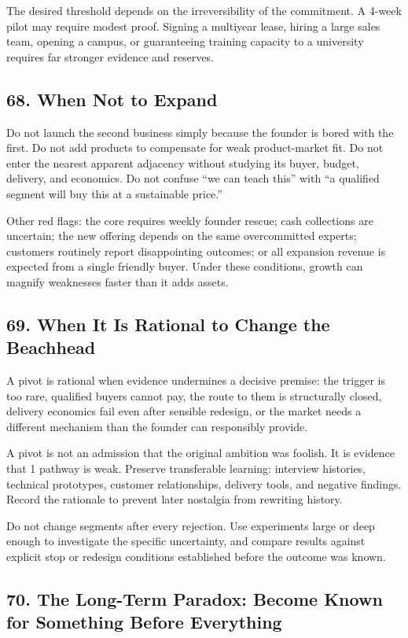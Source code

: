 The desired threshold depends on the irreversibility of the commitment. A 4-week pilot may require modest proof. Signing a multiyear lease, hiring a large sales team, opening a campus, or guaranteeing training capacity to a university requires far stronger evidence and reserves.

\subsection*{68. When Not to Expand}

Do not launch the second business simply because the founder is bored with the first. Do not add products to compensate for weak product-market fit. Do not enter the nearest apparent adjacency without studying its buyer, budget, delivery, and economics. Do not confuse ``we can teach this'' with ``a qualified segment will buy this at a sustainable price.''

Other red flags: the core requires weekly founder rescue; cash collections are uncertain; the new offering depends on the same overcommitted experts; customers routinely report disappointing outcomes; or all expansion revenue is expected from a single friendly buyer. Under these conditions, growth can magnify weaknesses faster than it adds assets.

\subsection*{69. When It Is Rational to Change the Beachhead}

A pivot is rational when evidence undermines a decisive premise: the trigger is too rare, qualified buyers cannot pay, the route to them is structurally closed, delivery economics fail even after sensible redesign, or the market needs a different mechanism than the founder can responsibly provide.

A pivot is not an admission that the original ambition was foolish. It is evidence that 1 pathway is weak. Preserve transferable learning: interview histories, technical prototypes, customer relationships, delivery tools, and negative findings. Record the rationale to prevent later nostalgia from rewriting history.

Do not change segments after every rejection. Use experiments large or deep enough to investigate the specific uncertainty, and compare results against explicit stop or redesign conditions established before the outcome was known.

\subsection*{70. The Long-Term Paradox: Become Known for Something Before Everything}


